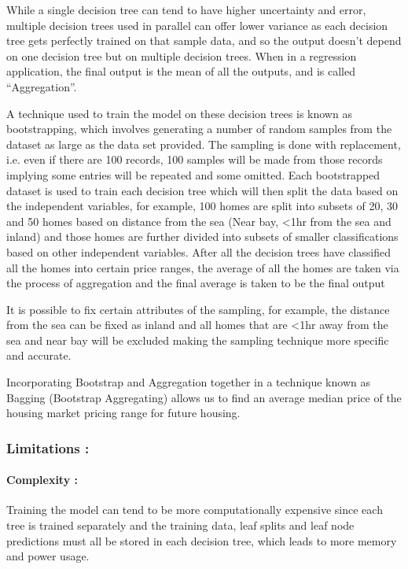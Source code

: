 \documentclass{article}
\begin{document}
While a single decision tree can tend to have higher uncertainty and error, multiple decision trees used in parallel can offer lower variance as each decision tree gets perfectly trained on that sample data, and so the output doesn’t depend on one decision tree but on multiple decision trees.
When in a regression application, the final output is the mean of all the outputs, and is called “Aggregation”.

A technique used to train the model on these decision trees is known as bootstrapping, which involves generating a number of random samples from the dataset as large as the data set provided. The sampling is done with replacement, i.e. even if there are 100 records, 100 samples will be made from those records implying some entries will be repeated and some omitted. Each bootstrapped dataset is used to train each decision tree which will then split the data based on the independent variables, for example, 100 homes are split into subsets of 20, 30 and 50 homes based on distance from the sea (Near bay, <1hr from the sea and inland) and those homes are further divided into subsets of smaller classifications based on other independent variables. 
After all the decision trees have classified all the homes into certain price ranges, the average of all the homes are taken via the process of aggregation and the final average is taken to be the final output

It is possible to fix certain attributes of the sampling, for example, the distance from the sea can be fixed as inland and all homes that are <1hr away from the sea and near bay will be excluded making the sampling technique more specific and accurate. 

Incorporating Bootstrap and Aggregation together in a technique known as Bagging (Bootstrap Aggregating) allows us to find an average median price of the housing market pricing range for future housing.

\subsubsection{Limitations :}
\paragraph{Complexity : }
Training the model can tend to be more computationally expensive since each tree is trained separately and the training data, leaf splits and leaf node predictions must all be stored in each decision tree, which leads to more memory and power usage.
\end{document}
